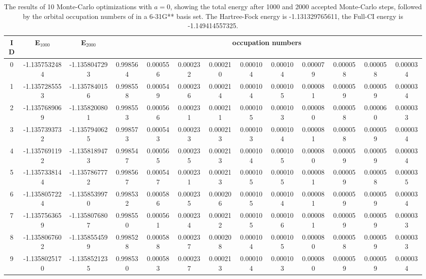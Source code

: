 \documentclass[pra,nofootinbib]{revtex4-1}
\newcommand{\dlabel}[1]{\text{#1}\label{#1}}
\begin{document}
\begin{table}
\begin{tabular}{|c|c|c|cccccccccc|}
\hline\hline 
ID & E$_{1000}$ & E$_{2000}$ & \multicolumn{10}{c}{occupation numbers} \\
\hline 
0 & -1.1357532484 & -1.1358047293 & 0.998564 & 0.000556 & 0.000232 & 0.000210 & 0.000104 & 0.000104 & 0.000079 & 0.000058 & 0.000058 & 0.000034 \\
1 & -1.1357285553 & -1.1357840156 & 0.998558 & 0.000549 & 0.000236 & 0.000214 & 0.000104 & 0.000105 & 0.000081 & 0.000059 & 0.000059 & 0.000034 \\
2 & -1.1357689069 & -1.1358200801 & 0.998553 & 0.000566 & 0.000231 & 0.000211 & 0.000105 & 0.000103 & 0.000080 & 0.000058 & 0.000060 & 0.000033 \\
3 & -1.1357393732 & -1.1357940625 & 0.998573 & 0.000543 & 0.000233 & 0.000213 & 0.000103 & 0.000104 & 0.000081 & 0.000058 & 0.000059 & 0.000034 \\
4 & -1.1357691192 & -1.1358189473 & 0.998547 & 0.000565 & 0.000235 & 0.000213 & 0.000104 & 0.000105 & 0.000080 & 0.000059 & 0.000059 & 0.000034 \\
5 & -1.1357338144 & -1.1357867772 & 0.998567 & 0.000547 & 0.000231 & 0.000213 & 0.000105 & 0.000105 & 0.000081 & 0.000059 & 0.000058 & 0.000035 \\
6 & -1.1358057224 & -1.1358539970 & 0.998532 & 0.000586 & 0.000235 & 0.000206 & 0.000105 & 0.000104 & 0.000081 & 0.000059 & 0.000059 & 0.000034 \\
7 & -1.1357563659 & -1.1358076807 & 0.998550 & 0.000561 & 0.000234 & 0.000212 & 0.000105 & 0.000106 & 0.000081 & 0.000059 & 0.000059 & 0.000033 \\
8 & -1.1358067602 & -1.1358554599 & 0.998528 & 0.000588 & 0.000237 & 0.000208 & 0.000104 & 0.000105 & 0.000080 & 0.000058 & 0.000059 & 0.000033 \\
9 & -1.1358025170 & -1.1358521235 & 0.998530 & 0.000583 & 0.000237 & 0.000213 & 0.000104 & 0.000103 & 0.000080 & 0.000059 & 0.000059 & 0.000034 \\
\hline\hline
\end{tabular}
\dlabel{Table:MCRenorm:1overNm1}
\caption{The results of 10 Monte-Carlo optimizations with $a=0$, showing the total energy after 1000 and 2000 
accepted Monte-Carlo steps, followed by the orbital occupation numbers of  in a 6-31G** basis
set. The Hartree-Fock energy is -1.131329765611, the Full-CI energy is -1.149414557325.}
\end{table}
\end{document}
